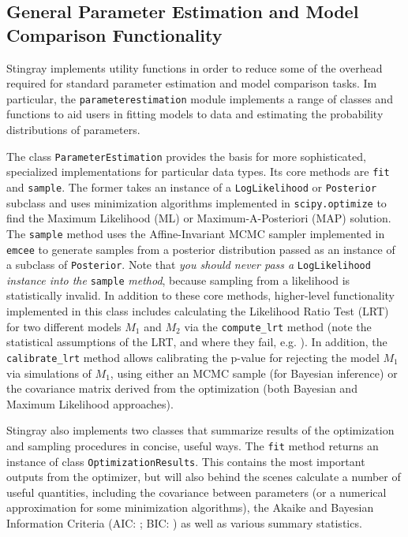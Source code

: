 \documentclass[twocolumn]{aastex62}
\begin{document}
\subsection{General Parameter Estimation and Model Comparison Functionality}

Stingray implements utility functions in order to reduce some of the overhead required for standard parameter estimation and model comparison tasks. Im particular, the \verb|parameterestimation| module implements a range of classes and functions to aid users in fitting models to data and estimating the probability distributions of parameters.

The class \texttt{ParameterEstimation} provides the basis for more sophisticated, specialized implementations for particular data types. Its core methods are \verb|fit| and \verb|sample|. The former takes an instance of a \verb|LogLikelihood| or \verb|Posterior| subclass and uses minimization algorithms implemented in \verb|scipy.optimize| to find the Maximum Likelihood (ML) or Maximum-A-Posteriori (MAP) solution. The \verb|sample| method uses the Affine-Invariant MCMC sampler implemented in \texttt{emcee} \citep{emcee} to generate samples from a posterior distribution passed as an instance of a subclass of \verb|Posterior|. Note that \textit{you should never pass a} \verb|LogLikelihood| \textit{instance into the} \verb|sample| \textit{method}, because sampling from a likelihood is statistically invalid. In addition to these core methods, higher-level functionality implemented in this class includes calculating the Likelihood Ratio Test (LRT) for two different models $M_1$ and $M_2$ via the \verb|compute_lrt| method (note the statistical assumptions of the LRT, and where they fail, e.g. \citealt{protassov2002}). In addition, the \verb|calibrate_lrt| method allows calibrating the p-value for rejecting the model $M_1$ via simulations of $M_1$, using either an MCMC sample (for Bayesian inference) or the covariance matrix derived from the optimization (both Bayesian and Maximum Likelihood approaches).

Stingray also implements two classes that summarize results of the optimization and sampling procedures in concise, useful ways. The \verb|fit| method returns an instance of class \verb|OptimizationResults|. This contains the most important outputs from the optimizer, but will also behind the scenes calculate a number of useful quantities, including the covariance between parameters (or a numerical approximation for some minimization algorithms), the Akaike and Bayesian Information Criteria (AIC: \citealt{akaike1974}; BIC: \citealt{schwarz1978}) as well as various summary statistics.%
\end{document}
